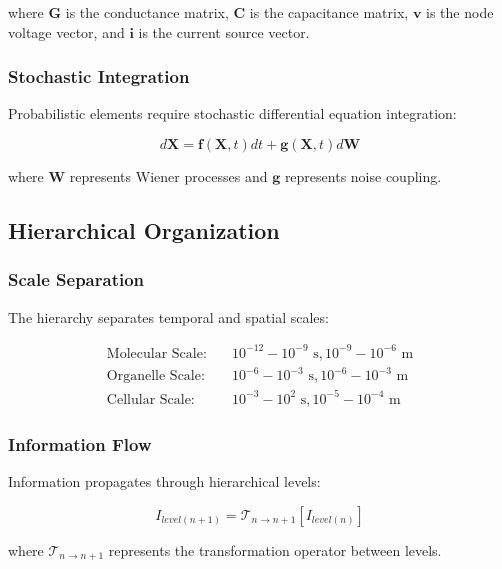 \documentclass[12pt,a4paper]{article}
\begin{document}
where $\mathbf{G}$ is the conductance matrix, $\mathbf{C}$ is the capacitance matrix, $\mathbf{v}$ is the node voltage vector, and $\mathbf{i}$ is the current source vector.

\subsubsection{Stochastic Integration}

Probabilistic elements require stochastic differential equation integration:

\begin{equation}
d\mathbf{X} = \mathbf{f}(\mathbf{X}, t)dt + \mathbf{g}(\mathbf{X}, t)d\mathbf{W}
\end{equation}

where $\mathbf{W}$ represents Wiener processes and $\mathbf{g}$ represents noise coupling.

\subsection{Hierarchical Organization}

\subsubsection{Scale Separation}

The hierarchy separates temporal and spatial scales:

\begin{align}
\text{Molecular Scale:} &\quad 10^{-12} - 10^{-9} \text{ s}, 10^{-9} - 10^{-6} \text{ m} \\
\text{Organelle Scale:} &\quad 10^{-6} - 10^{-3} \text{ s}, 10^{-6} - 10^{-3} \text{ m} \\
\text{Cellular Scale:} &\quad 10^{-3} - 10^{2} \text{ s}, 10^{-5} - 10^{-4} \text{ m}
\end{align}

\subsubsection{Information Flow}

Information propagates through hierarchical levels:

\begin{equation}
I_{level(n+1)} = \mathcal{T}_{n \rightarrow n+1}[I_{level(n)}]
\end{equation}

where $\mathcal{T}_{n \rightarrow n+1}$ represents the transformation operator between levels.
\end{document}
